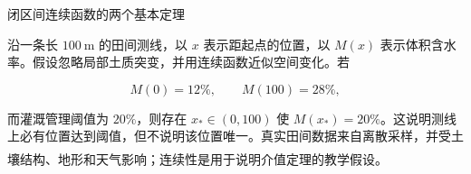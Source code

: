 \documentclass[aspectratio=169,10pt,fontset=fandol]{ctexbeamer}
\newcommand{\upcite}[1]{\textsuperscript{\textsuperscript{\cite{#1}}}}
\begin{document}
\begin{frame}[t,fragile]{闭区间连续函数的两个基本定理}
\normalsize
{\normalsize
\begin{application}[农业：田间含水率阈值]

沿一条长 $100\ \mathrm m$ 的田间测线，以 $x$ 表示距起点的位置，以 $M(x)$ 表示体积含水率。假设忽略局部土质突变，并用连续函数近似空间变化。若

\[

M(0)=12\%,\qquad M(100)=28\%,

\]

而灌溉管理阈值为 $20\%$，则存在 $x_*\in(0,100)$ 使 $M(x_*)=20\%$。这说明测线上必有位置达到阈值，但不说明该位置唯一。真实田间数据来自离散采样，并受土壤结构、地形和天气影响；连续性是用于说明介值定理的教学假设。\upcite{BradyWeil}

\end{application}
}
\end{frame}
\end{document}
